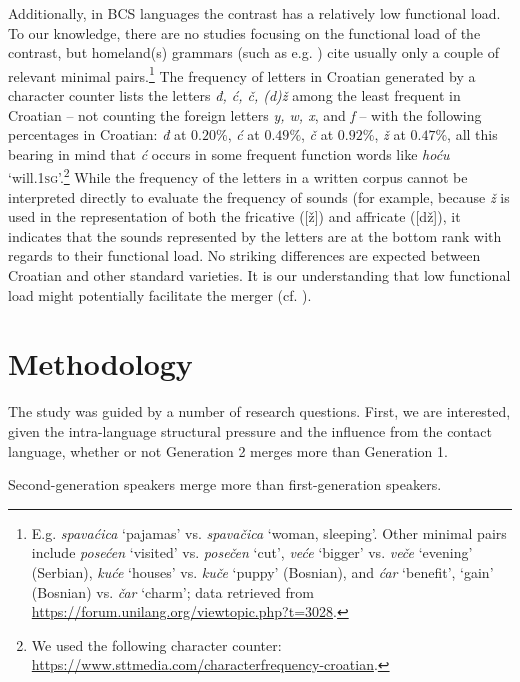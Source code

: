 \documentclass[output=paper,modfonts,newtxmath,hidelinks,]{langscibook}
\begin{document}
Additionally, in BCS languages the contrast has a relatively low functional load. To our knowledge, there are no studies focusing on the functional load of the contrast, but homeland(s) grammars (such as e.g. \citealt{Brozovic1991}) cite usually only a couple of relevant minimal pairs.\footnote{E.g. \textit{spavaćica} `pajamas' vs. \textit{spavačica} `woman, sleeping'. Other minimal pairs include \textit{posećen} `visited' vs. \textit{posečen} `cut', \textit{veće} `bigger' vs. \textit{veče} `evening' (Serbian), \textit{kuće} `houses' vs. \textit{kuče} `puppy' (Bosnian), and \textit{ćar} `benefit', `gain' (Bosnian) vs. \textit{čar} `charm'; data retrieved from \url{https://forum.unilang.org/viewtopic.php?t=3028}.} The frequency of letters in Croatian generated by a character counter lists the letters \textit{đ, ć, č, (d)ž} among the least frequent in Croatian – not counting the foreign letters \textit{y, w, x}, and \textit{f} – with the following percentages in Croatian: \textit{đ} at $0.20\%$, \textit{ć} at $0.49\%$, \textit{č} at $0.92\%$, \textit{ž} at $0.47\%$, all this bearing in mind that \textit{ć} occurs in some frequent function words like \textit{hoću} `will.\textsc{1sg}’.\footnote{We used the following character counter: \url{https://www.sttmedia.com/characterfrequency-croatian}.} While the frequency of the letters in a written corpus cannot be interpreted directly to evaluate the frequency of sounds (for example, because \textit{ž} is used in the representation of both the fricative ([ž]) and affricate ([dž]), it indicates that the sounds represented by the letters are at the bottom rank with regards to their functional load. No striking differences are expected between Croatian and other standard varieties. It is our understanding that low functional load might potentially facilitate the merger (cf. \citealt{Wedel-etal2013}).


\section{Methodology}\label{sec:mihajlovic:4}

The study was guided by a number of research questions. First, we are interested, given the intra-language structural pressure and the influence from the contact language, whether or not Generation 2 merges more than Generation 1.


\begin{exe}
  Second-generation speakers merge more than first-generation   speakers.
\end{exe}
\end{document}
